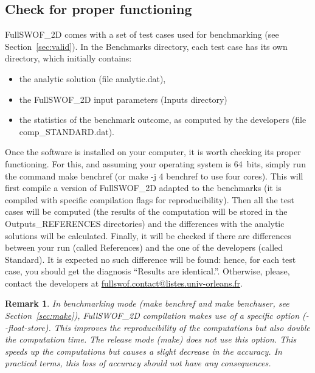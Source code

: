 \documentclass[a4paper, 11pt]{article}
\newcommand{\FullSWOF}{FullSWOF\_2D}
\newtheorem{rmk}{Remark}
\begin{document}
\subsection{Check for proper functioning}\label{sec:functionOK}
\FullSWOF{} comes with a set of test cases used for benchmarking (see Section~\ref{sec:valid}).
In the \textsf{Benchmarks} directory, each test case has its own directory, which initially contains:
\begin{itemize}
	\item the analytic solution (file \textsf{analytic.dat}),
	\item the \FullSWOF{} input parameters (\textsf{Inputs} directory)
	\item the statistics of the benchmark outcome, as computed by the developers (file \textsf{comp\_STANDARD.dat}).
\end{itemize}
Once the software is installed on your computer, it is worth checking its proper functioning.
For this, and assuming your operating system is 64~bits, simply run the command \textsf{make benchref} (or \textsf{make -j 4 benchref} to use four cores).
This will first compile a version of \FullSWOF{} adapted to the benchmarks (it is compiled with specific compilation flags for reproducibility).
Then all the test cases will be computed (the results of the computation will be stored in the \textsf{Outputs\_REFERENCES} directories) and the differences with the analytic solutions will be calculated.
Finally, it will be checked if there are differences between your run (called References) and the one of the developers (called Standard).
It is expected no such difference will be found: hence, for each test case, you should get the diagnosis ``Results are identical.''.
Otherwise, please, contact the developers at {\href{mailto:fullswof.contact@listes.univ-orleans.fr}{fullswof.contact@listes.univ-orleans.fr}}.

\begin{rmk}
	In benchmarking mode (\textnormal{\textsf{make benchref}} and \textnormal{\textsf{make benchuser}}, see Section~\ref{sec:make}), \FullSWOF{} compilation makes use of a specific option (\textnormal{\textsf{{-}{-}float-store}}).
	This improves the reproducibility of the computations but also double the computation time.
	The release mode (\textnormal{\textsf{make}}) does not use this option.
	This speeds up the computations but causes a slight decrease in the accuracy.
	In practical terms, this loss of accuracy should not have any consequences.
\end{rmk}
\end{document}
